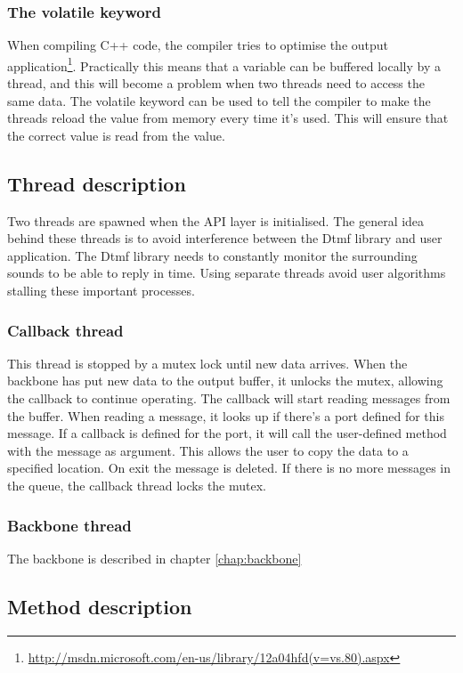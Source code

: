 \subsubsection{The volatile keyword}
When compiling C++ code, the compiler tries to optimise the output application\footnote{\url{http://msdn.microsoft.com/en-us/library/12a04hfd(v=vs.80).aspx}}. Practically this means that a variable can be buffered locally by a thread, and this will become a problem when two threads need to access the same data. The volatile keyword can be used to tell the compiler to make the threads reload the value from memory every time it's used. This will ensure that the correct value is read from the value.

\subsection{Thread description}
\label{api_thread_description}
Two threads are spawned when the API layer is initialised. The general idea behind these threads is to avoid interference between the Dtmf library and user application. The Dtmf library needs to constantly monitor the surrounding sounds to be able to reply in time. Using separate threads avoid user algorithms stalling these important processes.

\subsubsection{Callback thread}
This thread is stopped by a mutex lock until new data arrives. When the backbone has put new data to the output buffer, it unlocks the mutex, allowing the callback to continue operating. The callback will start reading messages from the buffer. When reading a message, it looks up if there's a port defined for this message. If a callback is defined for the port, it will call the user-defined method with the message as argument. This allows the user to copy the data to a specified location. On exit the message is deleted. If there is no more messages in the queue, the callback thread locks the mutex.

\subsubsection{Backbone thread}
The backbone is described in chapter \ref{chap:backbone}

\subsection{Method description}
\label{sub:api_method_description}
